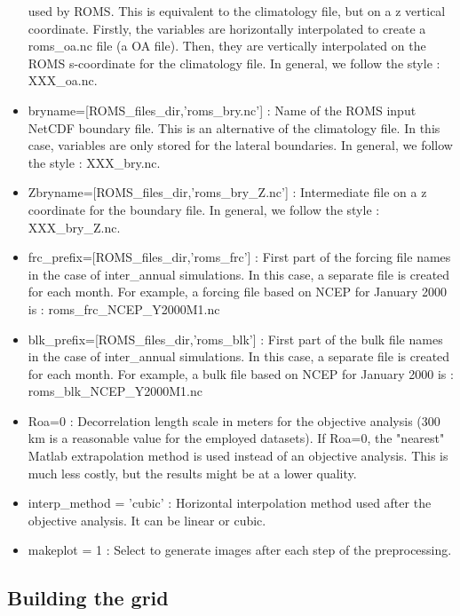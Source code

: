 \begin{itemize}
used by ROMS. This is equivalent to the climatology file, but on a z vertical coordinate.
Firstly, the variables are horizontally interpolated to create a roms\_oa.nc file (a OA file). 
Then, they are vertically interpolated on the ROMS s-coordinate for the climatology
file. In general, we follow the style : XXX\_oa.nc.
\item bryname=[ROMS\_files\_dir,'roms\_bry.nc'] : Name of the ROMS input NetCDF boundary file.
This is an alternative of the climatology file. In this case, variables are only stored for 
the lateral boundaries. In general, we follow the style : XXX\_bry.nc.
\item Zbryname=[ROMS\_files\_dir,'roms\_bry\_Z.nc'] : Intermediate file on a z coordinate
for the boundary file. In general, we follow the style : XXX\_bry\_Z.nc.
\item frc\_prefix=[ROMS\_files\_dir,'roms\_frc'] : First part of the forcing file names in
the case of inter\_annual simulations. In this case, a separate file is created for each month.
For example, a forcing file based on NCEP for January 2000 is : roms\_frc\_NCEP\_Y2000M1.nc
\item blk\_prefix=[ROMS\_files\_dir,'roms\_blk'] : First part of the bulk file names in
the case of inter\_annual simulations. In this case, a separate file is created for each month.
For example, a bulk file based on NCEP for January 2000 is : roms\_blk\_NCEP\_Y2000M1.nc
%
\item Roa=0 : Decorrelation length scale in meters for the objective analysis (300 km
is a reasonable value for the employed datasets). If Roa=0, the "nearest" Matlab extrapolation
method is used instead of an objective analysis. This is much less costly, but the 
results might be at a lower quality.
\item interp\_method = 'cubic' : Horizontal interpolation method used after the objective 
analysis. It can be linear or cubic.
\item makeplot     = 1 : Select to generate images after each step of the preprocessing.
\end{itemize}


\subsection{Building the grid}

